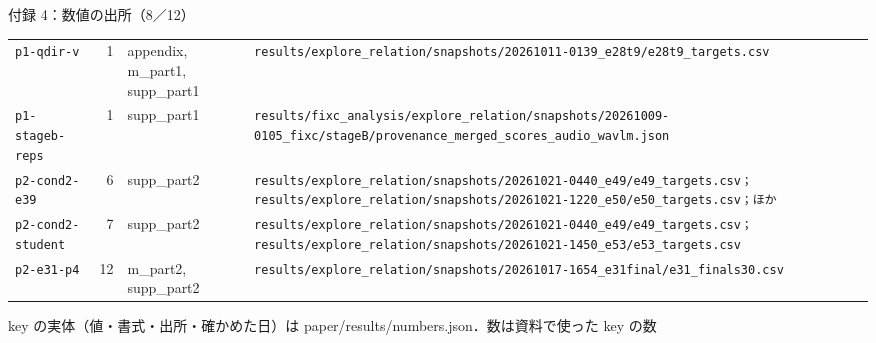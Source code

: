 \begin{frame}{付録 4：数値の出所（8／12）}
\begin{tabularx}{\textwidth}{@{}l r l X@{}}
    \texttt{p1-qdir-v} & 1 & appendix, m\_part1, supp\_part1 & \texttt{results/\allowbreak{}explore\_\allowbreak{}relation/\allowbreak{}snapshots/\allowbreak{}20261011-0139\_\allowbreak{}e28t9/\allowbreak{}e28t9\_\allowbreak{}targets.csv} \\
    \texttt{p1-stageb-reps} & 1 & supp\_part1 & \texttt{results/\allowbreak{}fixc\_\allowbreak{}analysis/\allowbreak{}explore\_\allowbreak{}relation/\allowbreak{}snapshots/\allowbreak{}20261009-0105\_\allowbreak{}fixc/\allowbreak{}stageB/\allowbreak{}provenance\_\allowbreak{}merged\_\allowbreak{}scores\_\allowbreak{}audio\_\allowbreak{}wavlm.json} \\
    \texttt{p2-cond2-e39} & 6 & supp\_part2 & \texttt{results/\allowbreak{}explore\_\allowbreak{}relation/\allowbreak{}snapshots/\allowbreak{}20261021-0440\_\allowbreak{}e49/\allowbreak{}e49\_\allowbreak{}targets.csv；results/\allowbreak{}explore\_\allowbreak{}relation/\allowbreak{}snapshots/\allowbreak{}20261021-1220\_\allowbreak{}e50/\allowbreak{}e50\_\allowbreak{}targets.csv；ほか} \\
    \texttt{p2-cond2-student} & 7 & supp\_part2 & \texttt{results/\allowbreak{}explore\_\allowbreak{}relation/\allowbreak{}snapshots/\allowbreak{}20261021-0440\_\allowbreak{}e49/\allowbreak{}e49\_\allowbreak{}targets.csv；results/\allowbreak{}explore\_\allowbreak{}relation/\allowbreak{}snapshots/\allowbreak{}20261021-1450\_\allowbreak{}e53/\allowbreak{}e53\_\allowbreak{}targets.csv} \\
    \texttt{p2-e31-p4} & 12 & m\_part2, supp\_part2 & \texttt{results/\allowbreak{}explore\_\allowbreak{}relation/\allowbreak{}snapshots/\allowbreak{}20261017-1654\_\allowbreak{}e31final/\allowbreak{}e31\_\allowbreak{}finals30.csv} \\
    \bottomrule
  \end{tabularx}\par
  {\raggedright\tiny key の実体（値・書式・出所・確かめた日）は paper/results/numbers.json．数は資料で使った key の数\par}
\end{frame}
